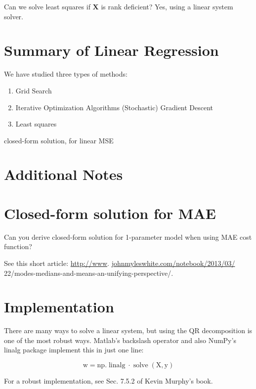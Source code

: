 \documentclass[10pt]{article}
\begin{document}
Can we solve least squares if $\mathbf{X}$ is rank deficient? Yes, using a linear system solver.

\section*{Summary of Linear Regression}
We have studied three types of methods:

\begin{enumerate}
  \item Grid Search

  \item Iterative Optimization Algorithms (Stochastic) Gradient Descent

  \item Least squares

\end{enumerate}

closed-form solution, for linear MSE

\section*{Additional Notes}
\section*{Closed-form solution for MAE}
Can you derive closed-form solution for 1-parameter model when using MAE cost function?

See this short article: \href{http://www}{http://www}. \href{http://johnmyleswhite.com/notebook/2013/03/}{johnmyleswhite.com/notebook/2013/03/} 22/modes-medians-and-means-an-unifying-perspective/.

\section*{Implementation}
There are many ways to solve a linear system, but using the QR decomposition is one of the most robust ways. Matlab's backslash operator and also NumPy's linalg package implement this in just one line:

$$
\mathrm{w}=\mathrm{np} . \operatorname{linalg} \cdot \operatorname{solve}(\mathrm{X}, \mathrm{y})
$$

For a robust implementation, see Sec. 7.5.2 of Kevin Murphy's book.
\end{document}
